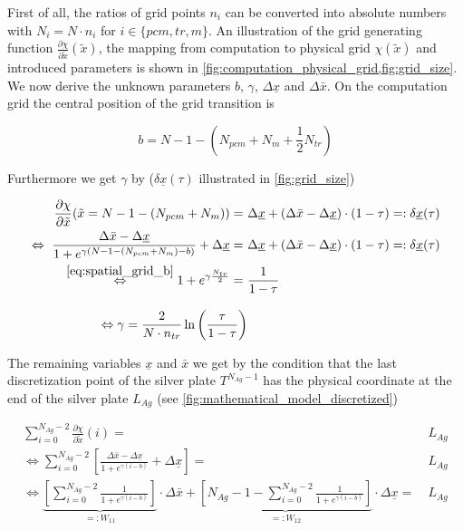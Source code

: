 \documentclass{scrartcl}[12pt, halfparskip]
\numberwithin{equation}{section}
\numberwithin{figure}{section}
\numberwithin{table}{section}
\begin{document}
First of all, the ratios of grid points $n_i$ can be converted into absolute numbers with $N_i = N \cdot n_i$ for $i \in \{ pcm, tr, m \}$. An illustration of the grid generating function $\frac{\partial \chi}{\partial \tilde{x}}(\tilde{x})$, the mapping from computation to physical grid $\chi(\tilde{x})$ and introduced parameters is shown in \cref{fig:computation_physical_grid,fig:grid_size}. \\
We now derive the unknown parameters $b$, $\gamma$, $\Delta \underline{x}$ and $\Delta \bar{x}$. On the computation grid the central position of the grid transition is

\begin{equation}
	b = N-1 - \left(N_{pcm} + N_m + \frac{1}{2} N_{tr} \right)
	\label{eq:spatial_grid_b}
\end{equation}

Furthermore we get $\gamma$ by ($\delta \underline{x}(\tau)$ illustrated in \cref{fig:grid_size})

\begin{subequations}
\begin{align}
	\frac{\partial \chi}{\partial \tilde{x}}(\tilde{x}=N-1-(N_{pcm}+N_m)) = \ & \Delta \underline{x} + (\Delta \bar{x} - \Delta \underline{x}) \cdot (1-\tau) =: \delta \underline{x}(\tau) \\
	\Leftrightarrow \ \frac{\Delta \bar{x} - \Delta \underline{x}}{1 + e^{\gamma(N-1-(N_{pcm}+N_m) - b)}} + \Delta \underline{x} = \ & \Delta \underline{x} + (\Delta \bar{x} - \Delta \underline{x}) \cdot (1-\tau) =: \delta \underline{x}(\tau)  \\
	\stackrel{\eqref{eq:spatial_grid_b}}{\Leftrightarrow}  1 + e^{\gamma \frac{N_{tr}}{2}} = \ & \frac{1}{1 - \tau}  \\[2ex]
	\Leftrightarrow \gamma = \frac{2}{N \cdot n_{tr}} \ln\left(\frac{\tau}{1-\tau}\right)
\end{align}
\end{subequations}

The remaining variables $\underline{x}$ and $\bar{x}$ we get by the condition that the last discretization point of the silver plate $T^{N_{Ag}-1}$ has the physical coordinate at the end of the silver plate $L_{Ag}$ (see \cref{fig:mathematical_model_discretized})

\begin{subequations}
	\begin{align}
	\sum_{i=0}^{N_{Ag} - 2} \frac{\partial \chi}{\partial \tilde{x}}(i) = \ & L_{Ag} \\
	\Leftrightarrow \sum_{i=0}^{N_{Ag} - 2} \left[ \frac{\Delta \bar{x} - \Delta \underline{x}}{1 + e^{\gamma(i - b)}} + \Delta \underline{x} \right] = \ & L_{Ag} \\
	\Leftrightarrow \underbrace{ \left[ \sum_{i=0}^{N_{Ag} - 2} \frac{1}{1 + e^{\gamma(i - b)}} \right] }_{=: W_{11}} \cdot \Delta \bar{x} + \underbrace{\left[ N_{Ag} - 1 - \sum_{i=0}^{N_{Ag} - 2} \frac{1}{1 + e^{\gamma(i - b)}} \right]}_{=: W_{12}} \cdot \Delta \underline{x} = \ & L_{Ag}
	\end{align}
\end{subequations}
\end{document}
